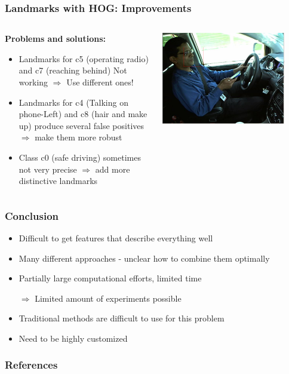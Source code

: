 \documentclass{beamer}
\begin{document}
	\begin{frame}
		\frametitle{Landmarks with HOG: Improvements}		
		\begin{columns}
			\begin{column}{0.5\textwidth}
                \textbf{Problems and solutions:}
				\begin{itemize}
					\item Landmarks for c5 (operating radio) and c7 (reaching behind) Not working $\Rightarrow$ Use different ones!
					\item Landmarks for c4 (Talking on phone-Left) and c8 (hair and make up) produce several false positives $\Rightarrow$ make them more robust
					\item Class c0 (safe driving) sometimes not very precise $\Rightarrow$ add more distinctive landmarks
				\end{itemize}
			\end{column}
			\begin{column}{0.5\textwidth}
				\begin{center}
					\includegraphics[width=0.85\textwidth]{mult_HOG/talk_phone_left}
				\end{center}
			\end{column}
		\end{columns}
		
	\end{frame}
	
	\begin{frame}
		\frametitle{Conclusion}		
		\begin{itemize}
			\item Difficult to get features that describe everything well
			\item Many different approaches - unclear how to combine them optimally
			\item Partially large computational efforts, limited time
			\item[$\Rightarrow$] Limited amount of experiments possible
			\vspace{0.5cm}
			\item Traditional methods are difficult to use for this problem
			\item Need to be highly customized
		\end{itemize}
	\end{frame}
	
	

    
	\begin{frame}[allowframebreaks]
		\frametitle{References} 
		\nocite{*} 
		 
		 
	\end{frame}

	\medskip
\end{document}
